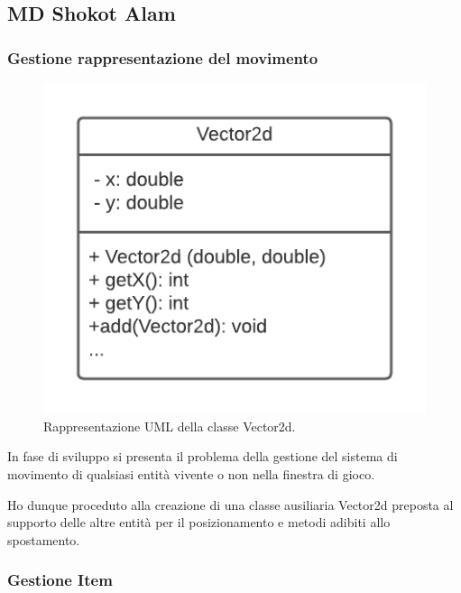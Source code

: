\documentclass[a4paper,12pt]{report}
\begin{document}
\subsection*{MD Shokot Alam}

\subsubsection{Gestione rappresentazione del movimento}

\begin{figure}[H]
\centering{}
\includegraphics[scale=0.75] {img/vector.png}
\caption{Rappresentazione UML della classe Vector2d.}
\label{img:vector}
\end{figure}

In fase di sviluppo si presenta  il problema della gestione del sistema di movimento di qualsiasi entità vivente o non nella finestra di gioco. 

Ho dunque proceduto alla creazione di una  classe ausiliaria Vector2d preposta  al supporto delle altre  entità per il posizionamento e metodi adibiti allo spostamento.

\subsubsection{Gestione Item}
\end{document}
